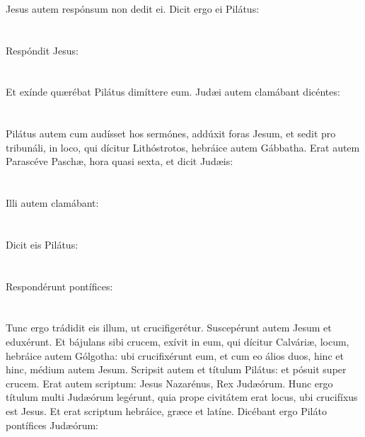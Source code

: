 \documentclass[12pt, a4paper]{article}
\begin{document}
	\\\\
	\\
	Jesus autem respónsum non dedit ei. Dicit ergo ei Pilátus:
	\\\\
	\\
	Respóndit Jesus:
	\\\\
	\\
	Et exínde quærébat Pilátus dimíttere eum. Judæi autem clamábant dicéntes: 
	\\\\
	\\
	Pilátus autem cum audísset hos sermónes, addúxit foras Jesum, et sedit pro tribunáli, in loco, qui dícitur Lithóstrotos, hebráice autem Gábbatha. Erat autem Parascéve Paschæ, hora quasi sexta, et dicit Judæis:
	\\\\
	\\
	Illi autem clamábant:
	\\\\
	\\
	Dicit eis Pilátus:
	\\\\
	\\
	Respondérunt pontífices:
	\\\\
	\\
	Tunc ergo trádidit eis illum, ut crucifigerétur. Suscepérunt autem Jesum et eduxérunt. Et bájulans sibi crucem, exívit in eum, qui dícitur Calváriæ, locum, hebráice autem Gólgotha: ubi crucifixérunt eum, et cum eo álios duos, hinc et hinc, médium autem Jesum. Scripsit autem et títulum Pilátus: et pósuit super crucem. Erat autem scriptum: Jesus Nazarénus, Rex Judæórum. Hunc ergo títulum multi Judæórum legérunt, quia prope civitátem erat locus, ubi crucifíxus est Jesus. Et erat scriptum hebráice, græce et latíne. Dicébant ergo Piláto pontífices Judæórum:
	\\\\
\end{document}
